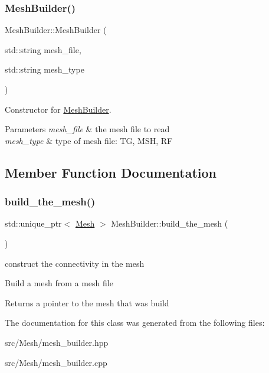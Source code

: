 \subsubsection{\texorpdfstring{Mesh\+Builder()}{MeshBuilder()}}
{\footnotesize\ttfamily Mesh\+Builder\+::\+Mesh\+Builder (\begin{DoxyParamCaption}\item[{std\+::string}]{mesh\+\_\+file,  }\item[{std\+::string}]{mesh\+\_\+type }\end{DoxyParamCaption})}

Constructor for \hyperlink{classHArDCore3D_1_1MeshBuilder}{Mesh\+Builder}. 
\begin{DoxyParams}{Parameters}
{\em mesh\+\_\+file} & the mesh file to read \\
\hline
{\em mesh\+\_\+type} & type of mesh file\+: TG, M\+SH, RF \\
\hline
\end{DoxyParams}


\subsection{Member Function Documentation}
\mbox{\label{classHArDCore3D_1_1MeshBuilder_a208c94e8cb6490226215b59eb67e7911}} 
\subsubsection{\texorpdfstring{build\+\_\+the\+\_\+mesh()}{build\_the\_mesh()}}
{\footnotesize\ttfamily std\+::unique\+\_\+ptr$<$ \hyperlink{classHArDCore3D_1_1Mesh}{Mesh} $>$ Mesh\+Builder\+::build\+\_\+the\+\_\+mesh (\begin{DoxyParamCaption}{ }\end{DoxyParamCaption})}



construct the connectivity in the mesh 

Build a mesh from a mesh file

\begin{DoxyReturn}{Returns}
a pointer to the mesh that was build 
\end{DoxyReturn}


The documentation for this class was generated from the following files\+:\begin{DoxyCompactItemize}
\item 
src/\+Mesh/mesh\+\_\+builder.\+hpp\item 
src/\+Mesh/mesh\+\_\+builder.\+cpp\end{DoxyCompactItemize}
